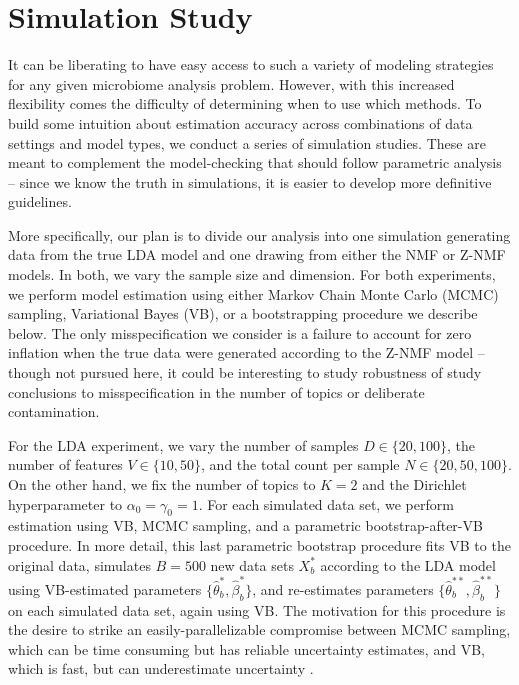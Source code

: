 \documentclass[oupdraft]{bio}
\begin{document}
\section{Simulation Study}

It can be liberating to have easy access to such a variety of modeling
strategies for any given microbiome analysis problem. However, with this
increased flexibility comes the difficulty of determining when to use which
methods. To build some intuition about estimation accuracy across combinations
of data settings and model types, we conduct a series of simulation studies. These are
meant to complement the model-checking that should follow parametric analysis --
since we know the truth in simulations, it is easier to develop more definitive
guidelines.

More specifically, our plan is to divide our analysis into one simulation
generating data from the true LDA model and one drawing from either the NMF or
Z-NMF models. In both, we vary the sample size and dimension. For both
experiments, we perform model estimation using either Markov Chain Monte Carlo
(MCMC) sampling, Variational Bayes (VB), or a bootstrapping procedure we
describe below. The only misspecification we consider is a failure to account
for zero inflation when the true data were generated according to the Z-NMF
model -- though not pursued here, it could be interesting to study robustness of
study conclusions to misspecification in the number of topics or deliberate
contamination.

For the LDA experiment, we vary the number of samples $D \in \{20, 100\}$, the
number of features $V \in \{10, 50\}$, and the total count per sample $N \in
\{20, 50, 100\}$. On the other hand, we fix the number of topics to $K = 2$ and
the Dirichlet hyperparameter to $\alpha_{0} = \gamma_{0} = 1$. For each
simulated data set, we perform estimation using VB, MCMC sampling, and a
parametric bootstrap-after-VB procedure. In more detail, this last parametric
bootstrap procedure fits VB to the original data, simulates $B = 500$ new data
sets $X^{\ast}_{b}$ according to the LDA model using VB-estimated parameters
$\{\hat{\theta}^{\ast}_{b}, \hat{\beta}^{\ast}_{b}\}$, and re-estimates
parameters $\{\hat{\theta}^{\ast\ast}_{b}, \hat{\beta}^{\ast\ast}_{b}\}$ on each
simulated data set, again using VB. The motivation for this procedure is the
desire to strike an easily-parallelizable compromise between MCMC sampling,
which can be time consuming but has reliable uncertainty estimates, and VB,
which is fast, but can underestimate uncertainty \citep{wang2005inadequacy}.
\end{document}

